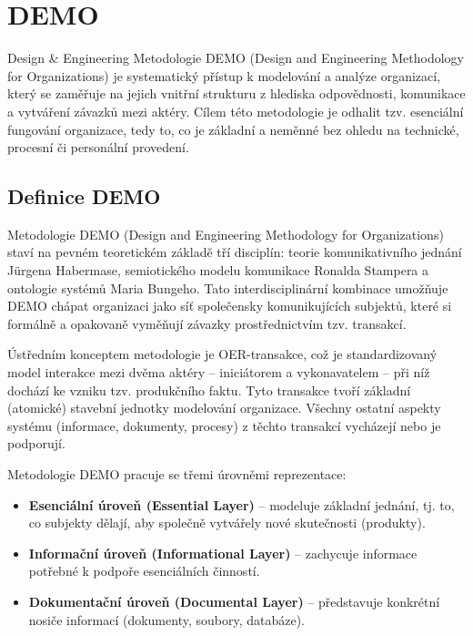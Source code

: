 
\section{DEMO}
\label{sec:demo}
Design \& Engineering Metodologie DEMO (Design and Engineering Methodology for Organizations) je systematický přístup k modelování a analýze organizací, který se zaměřuje na jejich vnitřní strukturu z hlediska odpovědnosti, komunikace a vytváření závazků mezi aktéry. Cílem této metodologie je odhalit tzv. esenciální fungování organizace, tedy to, co je základní a neměnné bez ohledu na technické, procesní či personální provedení. \cite{Dietz2020}


\subsection{Definice DEMO}
\label{sec:definice-demo}
Metodologie DEMO (Design and Engineering Methodology for Organizations) staví na pevném teoretickém základě tří disciplín: teorie komunikativního jednání Jürgena Habermase, semiotického modelu komunikace Ronalda Stampera a ontologie systémů Maria Bungeho. Tato interdisciplinární kombinace umožňuje DEMO chápat organizaci jako síť společensky komunikujících subjektů, které si formálně a opakovaně vyměňují závazky prostřednictvím tzv. transakcí. \cite{Dietz1999}

Ústředním konceptem metodologie je OER-transakce, což je standardizovaný model interakce mezi dvěma aktéry – iniciátorem a vykonavatelem – při níž dochází ke vzniku tzv. produkčního faktu. Tyto transakce tvoří základní (atomické) stavební jednotky modelování organizace. Všechny ostatní aspekty systému (informace, dokumenty, procesy) z těchto transakcí vycházejí nebo je podporují. \cite{Dietz2020, Dietz1999}

Metodologie DEMO pracuje se třemi úrovněmi reprezentace:
\begin{itemize}
\item \textbf{Esenciální úroveň (Essential Layer)} – modeluje základní jednání, tj. to, co subjekty dělají, aby společně vytvářely nové skutečnosti (produkty).
\item \textbf{Informační úroveň (Informational Layer)} – zachycuje informace potřebné k podpoře esenciálních činností.
\item \textbf{Dokumentační úroveň (Documental Layer)} – představuje konkrétní nosiče informací (dokumenty, soubory, databáze). \cite{Dietz1999}
\end{itemize}

